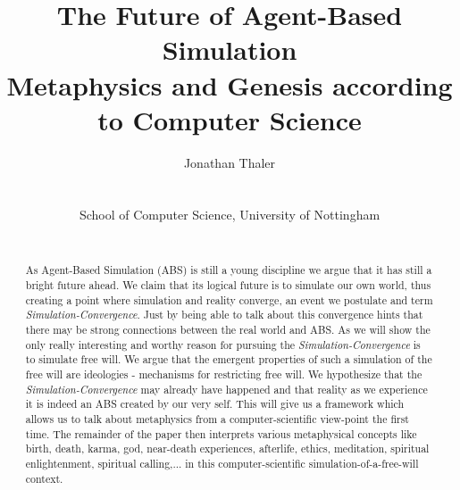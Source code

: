 \documentclass[a4paper, 10pt, conference]{../../templates/IEEEconf/IEEEconf}
\title{The Future of Agent-Based Simulation \\ Metaphysics and Genesis according to Computer Science}
\author{
	Jonathan Thaler \\
	\email{jonathan.thaler@nottingham.ac.uk} \\
	\begin{affiliation}
		School of Computer Science, University of Nottingham
	\end{affiliation} \\
}
\begin{document}
\maketitle

\begin{abstract}
As Agent-Based Simulation (ABS) is still a young discipline we argue that it has still a bright future ahead. We claim that its logical future is to simulate our own world, thus creating a point where simulation and reality converge, an event we postulate and term \textit{Simulation-Convergence}. Just by being able to talk about this convergence hints that there may be strong connections between the real world and ABS. As we will show the only really interesting and worthy reason for pursuing the \textit{Simulation-Convergence} is to simulate free will. We argue that the emergent properties of such a simulation of the free will are ideologies - mechanisms for restricting free will. We hypothesize that the \textit{Simulation-Convergence} may already have happened and that reality as we experience it is indeed an ABS created by our very self. This will give us a framework which allows us to talk about metaphysics from a computer-scientific view-point the first time. The remainder of the paper then interprets various metaphysical concepts like birth, death, karma, god, near-death experiences, afterlife, ethics, meditation, spiritual enlightenment, spiritual calling,... in this computer-scientific simulation-of-a-free-will context.
\end{abstract}













\end{document}
